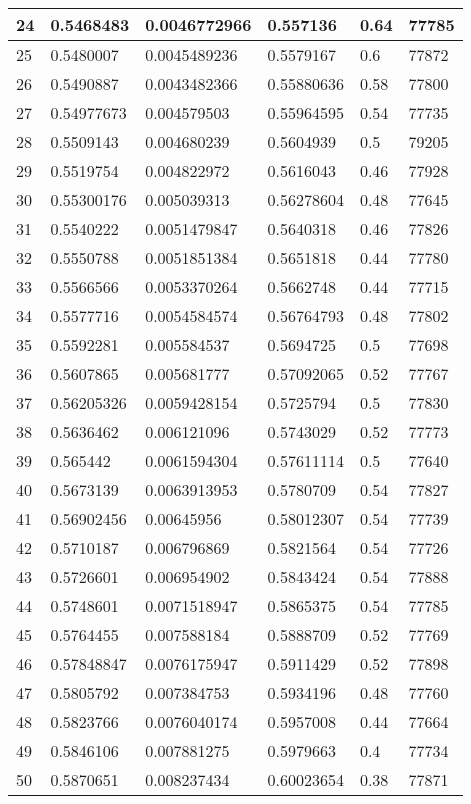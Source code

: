 \begin{longtable}{|l|l|l|l|l|l|}
24 & 0.5468483 & 0.0046772966 & 0.557136 & 0.64 & 77785 \\ \hline 
25 & 0.5480007 & 0.0045489236 & 0.5579167 & 0.6 & 77872 \\ \hline 
26 & 0.5490887 & 0.0043482366 & 0.55880636 & 0.58 & 77800 \\ \hline 
27 & 0.54977673 & 0.004579503 & 0.55964595 & 0.54 & 77735 \\ \hline 
28 & 0.5509143 & 0.004680239 & 0.5604939 & 0.5 & 79205 \\ \hline 
29 & 0.5519754 & 0.004822972 & 0.5616043 & 0.46 & 77928 \\ \hline 
30 & 0.55300176 & 0.005039313 & 0.56278604 & 0.48 & 77645 \\ \hline 
31 & 0.5540222 & 0.0051479847 & 0.5640318 & 0.46 & 77826 \\ \hline 
32 & 0.5550788 & 0.0051851384 & 0.5651818 & 0.44 & 77780 \\ \hline 
33 & 0.5566566 & 0.0053370264 & 0.5662748 & 0.44 & 77715 \\ \hline 
34 & 0.5577716 & 0.0054584574 & 0.56764793 & 0.48 & 77802 \\ \hline 
35 & 0.5592281 & 0.005584537 & 0.5694725 & 0.5 & 77698 \\ \hline 
36 & 0.5607865 & 0.005681777 & 0.57092065 & 0.52 & 77767 \\ \hline 
37 & 0.56205326 & 0.0059428154 & 0.5725794 & 0.5 & 77830 \\ \hline 
38 & 0.5636462 & 0.006121096 & 0.5743029 & 0.52 & 77773 \\ \hline 
39 & 0.565442 & 0.0061594304 & 0.57611114 & 0.5 & 77640 \\ \hline 
40 & 0.5673139 & 0.0063913953 & 0.5780709 & 0.54 & 77827 \\ \hline 
41 & 0.56902456 & 0.00645956 & 0.58012307 & 0.54 & 77739 \\ \hline 
42 & 0.5710187 & 0.006796869 & 0.5821564 & 0.54 & 77726 \\ \hline 
43 & 0.5726601 & 0.006954902 & 0.5843424 & 0.54 & 77888 \\ \hline 
44 & 0.5748601 & 0.0071518947 & 0.5865375 & 0.54 & 77785 \\ \hline 
45 & 0.5764455 & 0.007588184 & 0.5888709 & 0.52 & 77769 \\ \hline 
46 & 0.57848847 & 0.0076175947 & 0.5911429 & 0.52 & 77898 \\ \hline 
47 & 0.5805792 & 0.007384753 & 0.5934196 & 0.48 & 77760 \\ \hline 
48 & 0.5823766 & 0.0076040174 & 0.5957008 & 0.44 & 77664 \\ \hline 
49 & 0.5846106 & 0.007881275 & 0.5979663 & 0.4 & 77734 \\ \hline 
50 & 0.5870651 & 0.008237434 & 0.60023654 & 0.38 & 77871 \\ \hline 
\end{longtable}